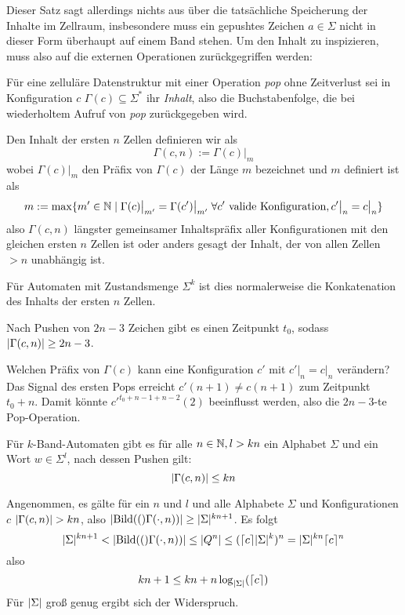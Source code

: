 \documentclass{article}
\begin{document}
Dieser Satz sagt allerdings nichts aus über die tatsächliche Speicherung der Inhalte im Zellraum, insbesondere muss ein gepushtes Zeichen $a \in \Sigma$ nicht in dieser Form überhaupt auf einem Band stehen. Um den Inhalt zu inspizieren, muss also auf die externen Operationen zurückgegriffen werden:

\begin{definition}
    Für eine zelluläre Datenstruktur mit einer Operation \emph{pop} ohne Zeitverlust sei in Konfiguration $c$ $\Gamma(c) \subseteq \Sigma^*$ ihr \emph{Inhalt}, also die Buchstabenfolge, die bei wiederholtem Aufruf von \emph{pop} zurückgegeben wird.

    Den Inhalt der ersten $n$ Zellen definieren wir als
        \[ \Gamma(c,n) := \Gamma(c) \big|_m \]
    wobei $\Gamma(c) \big|_m$ den Präfix von $\Gamma(c)$ der Länge $m$ bezeichnet und $m$ definiert ist als
    \[ m := \max \{m' \in \mathbb{N} \mid \Gamma(c) \big|_{m'} = \Gamma(c') \big|_{m'} \;\forall c' \text{ valide Konfiguration}, c' \big|_n = c \big|_n \} \]
    also $\Gamma(c,n)$ längster gemeinsamer Inhaltspräfix aller Konfigurationen mit den gleichen ersten $n$ Zellen ist oder anders gesagt der Inhalt, der von allen Zellen $> n$ unabhängig ist.

    Für Automaten mit Zustandsmenge $\Sigma^k$ ist dies normalerweise die Konkatenation des Inhalts der ersten $n$ Zellen.
\end{definition}

\begin{satz}
    \label{thm:locontent}
    Nach Pushen von $2n-3$ Zeichen gibt es einen Zeitpunkt $t_0$, sodass $\lvert\Gamma(c,n)\rvert \geq 2n-3$.
    \begin{beweis}
        Welchen Präfix von $\Gamma(c)$ kann eine Konfiguration $c'$ mit $c' \big|_n = c \big|_n$ verändern? Das Signal des ersten Pops erreicht $c'(n+1) \neq c(n+1)$ zum Zeitpunkt $t_0+n$. Damit könnte $c'^{t_0+n-1+n-2}(2)$ beeinflusst werden, also die $2n-3$-te Pop-Operation.
    \end{beweis}
\end{satz}

\begin{satz}
    \label{cor:spacesize}
    Für $k$-Band-Automaten gibt es für alle $n \in \mathbb{N}, l > kn$ ein Alphabet $\Sigma$ und ein Wort $w \in \Sigma^l$, nach dessen Pushen gilt:
    \[ \lvert\Gamma(c,n)\rvert \leq kn \]
    \begin{beweis}
        Angenommen, es gälte für ein $n$ und $l$ und alle Alphabete $\Sigma$ und Konfigurationen $c$ $\lvert\Gamma(c,n)\rvert > kn$, also $\lvert\text{Bild}(()\Gamma(\cdot,n))\rvert \geq \lvert\Sigma\rvert^{kn+1}$.
        Es folgt
        \[ \lvert\Sigma\rvert^{kn+1} < \lvert\text{Bild}(()\Gamma(\cdot,n))\rvert \leq \lvert Q^n\rvert \leq (\lceil c\rceil\lvert\Sigma\rvert^k)^n = \lvert\Sigma\rvert^{kn} \lceil c\rceil^n \]
        also
        \[ kn + 1 \leq kn + n \log_{\lvert\Sigma\rvert}(\lceil c\rceil) \]
        Für $\lvert\Sigma\rvert$ groß genug ergibt sich der Widerspruch.
    \end{beweis}
\end{satz}
\end{document}
